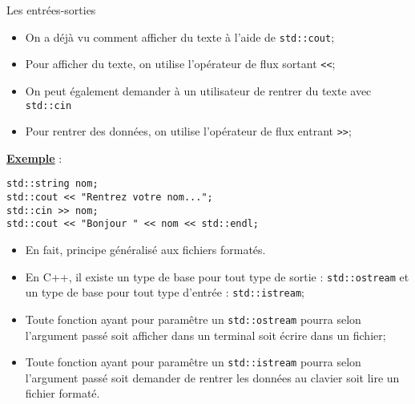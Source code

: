 \documentclass[compress,10pt,aspectratio=169]{beamer}
\begin{document}
\begin{frame}[fragile]{Les entrées-sorties}
  \scriptsize
  
  \begin{itemize}
  \item On a déjà vu comment afficher du texte à l'aide de \texttt{std::cout};
  \item Pour afficher du texte, on utilise l'opérateur de flux sortant \texttt{<<};
  \item On peut également demander à un utilisateur de rentrer du texte avec \texttt{std::cin}
  \item Pour rentrer des données, on utilise l'opérateur de flux entrant \texttt{>>};
  \end{itemize}
  
  \underline{\textbf{Exemple}} :
\begin{verbatim}
std::string nom;
std::cout << "Rentrez votre nom...";
std::cin >> nom;
std::cout << "Bonjour " << nom << std::endl;
\end{verbatim}
  
\begin{itemize}
  \item En fait, principe généralisé aux fichiers formatés.
  \item En C++, il existe un type de base pour tout type de sortie : \texttt{std::ostream} et un type de base pour tout type d'entrée : \texttt{std::istream};
  \item Toute fonction ayant pour paramêtre un \texttt{std::ostream} pourra selon l'argument passé soit afficher dans un terminal soit écrire dans un fichier;
  \item Toute fonction ayant pour paramêtre un \texttt{std::istream} pourra selon l'argument passé soit demander de rentrer les données au clavier soit lire un fichier formaté.
\end{itemize}
\end{frame}
  
\end{document}
